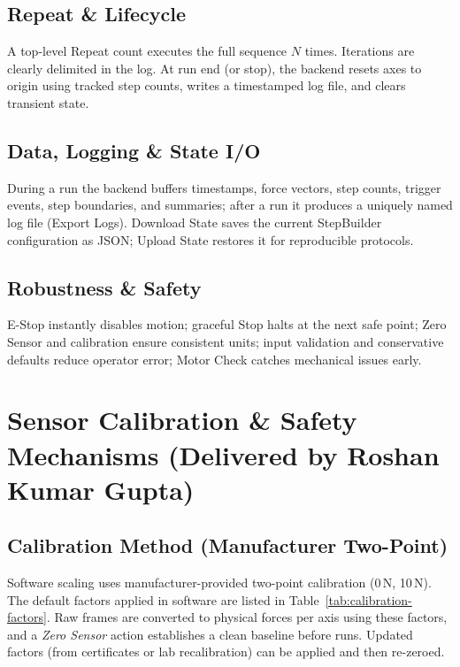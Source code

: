 \documentclass[
    twocolumn,
    fontsize = 10pt,
    parskip = half+,
    headings = small,
    headwidth = text,
    footwidth = text,
]{scrartcl}
\begin{document}
\subsection{Repeat \& Lifecycle}
A top-level Repeat count executes the full sequence $N$ times. Iterations are clearly delimited in the log. At run end (or stop), the backend resets axes to origin using tracked step counts, writes a timestamped log file, and clears transient state.

\subsection{Data, Logging \& State I/O}
During a run the backend buffers timestamps, force vectors, step counts, trigger events, step boundaries, and summaries; after a run it produces a uniquely named log file (Export Logs). Download State saves the current StepBuilder configuration as JSON; Upload State restores it for reproducible protocols.

\subsection{Robustness \& Safety}
E-Stop instantly disables motion; graceful Stop halts at the next safe point; Zero Sensor and calibration ensure consistent units; input validation and conservative defaults reduce operator error; Motor Check catches mechanical issues early.


\section{Sensor Calibration \& Safety Mechanisms \textnormal{(Delivered by Roshan Kumar Gupta)}}
\label{sec:calibration}

\subsection{Calibration Method (Manufacturer Two-Point)}
Software scaling uses manufacturer-provided two-point calibration (0\,N, 10\,N). The default factors applied in software are listed in Table~\ref{tab:calibration-factors}. Raw frames are converted to physical forces per axis using these factors, and a \emph{Zero Sensor} action establishes a clean baseline before runs. Updated factors (from certificates or lab recalibration) can be applied and then re-zeroed.
\end{document}
